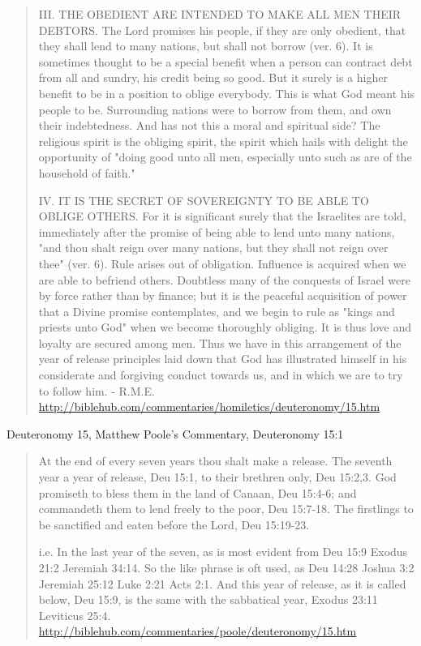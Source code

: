 \documentclass[11pt]{article}
\begin{document}
\begin{quote}
III. THE OBEDIENT ARE INTENDED TO MAKE ALL MEN THEIR DEBTORS. The Lord promises his people, if they are only obedient, that they shall lend to many nations, but shall not borrow (ver. 6). It is sometimes thought to be a special benefit when a person can contract debt from all and sundry, his credit being so good. But it surely is a higher benefit to be in a position to oblige everybody. This is what God meant his people to be. Surrounding nations were to borrow from them, and own their indebtedness. And has not this a moral and spiritual side? The religious spirit is the obliging spirit, the spirit which hails with delight the opportunity of "doing good unto all men, especially unto such as are of the household of faith."

IV. IT IS THE SECRET OF SOVEREIGNTY TO BE ABLE TO OBLIGE OTHERS. For it is significant surely that the Israelites are told, immediately after the promise of being able to lend unto many nations, "and thou shalt reign over many nations, but they shall not reign over thee" (ver. 6). Rule arises out of obligation. Influence is acquired when we are able to befriend others. Doubtless many of the conquests of Israel were by force rather than by finance; but it is the peaceful acquisition of power that a Divine promise contemplates, and we begin to rule as "kings and priests unto God" when we become thoroughly obliging. It is thus love and loyalty are secured among men. Thus we have in this arrangement of the year of release principles laid down that God has illustrated himself in his considerate and forgiving conduct towards us, and in which we are to try to follow him. - R.M.E.
\url{http://biblehub.com/commentaries/homiletics/deuteronomy/15.htm}
\end{quote}

Deuteronomy 15, Matthew Poole's Commentary, Deuteronomy 15:1
\begin{quote}
At the end of every seven years thou shalt make a release.
The seventh year a year of release, Deu 15:1, to their brethren only, Deu 15:2,3. God promiseth to bless them in the land of Canaan, Deu 15:4-6; and commandeth them to lend freely to the poor, Deu 15:7-18. The firstlings to be sanctified and eaten before the Lord, Deu 15:19-23. 

i.e. In the last year of the seven, as is most evident from Deu 15:9 Exodus 21:2 Jeremiah 34:14. So the like phrase is oft used, as Deu 14:28 Joshua 3:2 Jeremiah 25:12 Luke 2:21 Acts 2:1. And this year of release, as it is called below, Deu 15:9, is the same with the sabbatical year, Exodus 23:11 Leviticus 25:4. 
\url{http://biblehub.com/commentaries/poole/deuteronomy/15.htm}
\end{quote}
\end{document}
